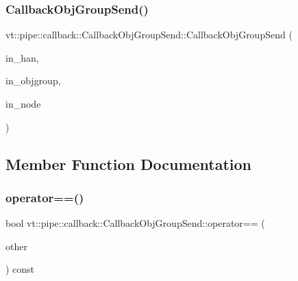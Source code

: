 \mbox{\label{structvt_1_1pipe_1_1callback_1_1_callback_obj_group_send_a4ddc589bf578055a3e96b62be954c12e}} 
\subsubsection{\texorpdfstring{Callback\+Obj\+Group\+Send()}{CallbackObjGroupSend()}\hspace{0.1cm}{\footnotesize\ttfamily [2/2]}}
{\footnotesize\ttfamily vt\+::pipe\+::callback\+::\+Callback\+Obj\+Group\+Send\+::\+Callback\+Obj\+Group\+Send (\begin{DoxyParamCaption}\item[{\hyperlink{namespacevt_af64846b57dfcaf104da3ef6967917573}{Handler\+Type}}]{in\+\_\+han,  }\item[{\hyperlink{namespacevt_ad7cae989df485fccca57f0792a880a8e}{Obj\+Group\+Proxy\+Type}}]{in\+\_\+objgroup,  }\item[{\hyperlink{namespacevt_a866da9d0efc19c0a1ce79e9e492f47e2}{Node\+Type}}]{in\+\_\+node }\end{DoxyParamCaption})\hspace{0.3cm}{\ttfamily [inline]}}



\subsection{Member Function Documentation}
\mbox{\label{structvt_1_1pipe_1_1callback_1_1_callback_obj_group_send_a32e50947e4799023db35e63f80575c63}} 
\subsubsection{\texorpdfstring{operator==()}{operator==()}}
{\footnotesize\ttfamily bool vt\+::pipe\+::callback\+::\+Callback\+Obj\+Group\+Send\+::operator== (\begin{DoxyParamCaption}\item[{\hyperlink{structvt_1_1pipe_1_1callback_1_1_callback_obj_group_send}{Callback\+Obj\+Group\+Send} const \&}]{other }\end{DoxyParamCaption}) const\hspace{0.3cm}{\ttfamily [inline]}}


